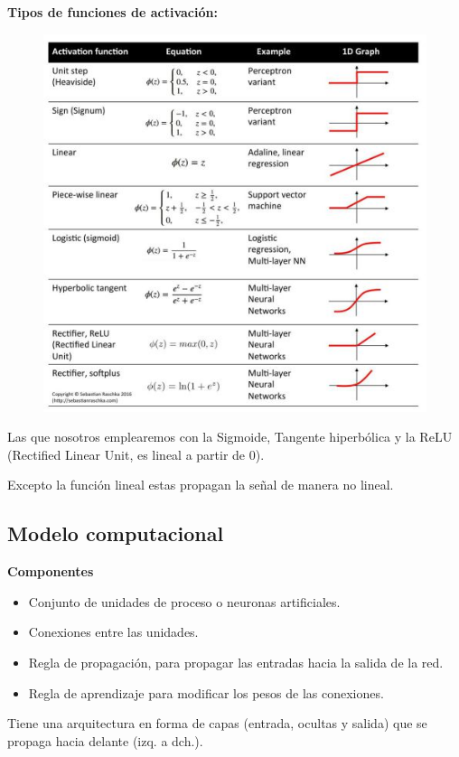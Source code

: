 \documentclass[12pt, twoside, openright]{report} %
\begin{document}
\textbf{Tipos de funciones de activación:}
\begin{figure}[H]
	{\includegraphics[scale=.8]{tipos-fun-act.jpg}}
\end{figure}

Las que nosotros emplearemos con la Sigmoide, Tangente hiperbólica y la ReLU (Rectified Linear Unit, es lineal a partir de 0).

Excepto la función lineal estas propagan la señal de manera no lineal.
\pagebreak

\subsection{Modelo computacional}
\textbf{Componentes}
\begin{itemize}
	\item Conjunto de unidades de proceso o neuronas artificiales.
	\item Conexiones entre las unidades.
	\item Regla de propagación, para propagar las entradas hacia la salida de la red.
	\item Regla de aprendizaje para modificar los pesos de las conexiones.
\end{itemize}

Tiene una arquitectura en forma de capas (entrada, ocultas y salida) que se propaga hacia delante (izq. a dch.).
\end{document}
